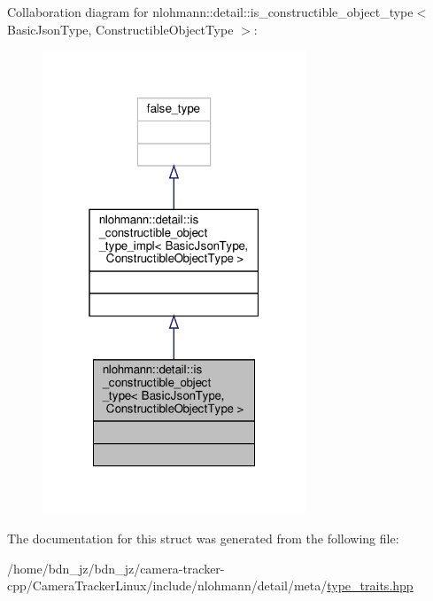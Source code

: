 Collaboration diagram for nlohmann\+:\+:detail\+:\+:is\+\_\+constructible\+\_\+object\+\_\+type$<$ Basic\+Json\+Type, Constructible\+Object\+Type $>$\+:
\nopagebreak
\begin{figure}[H]
\begin{center}
\leavevmode
\includegraphics[width=223pt]{structnlohmann_1_1detail_1_1is__constructible__object__type__coll__graph}
\end{center}
\end{figure}


The documentation for this struct was generated from the following file\+:\begin{DoxyCompactItemize}
\item 
/home/bdn\+\_\+jz/bdn\+\_\+jz/camera-\/tracker-\/cpp/\+Camera\+Tracker\+Linux/include/nlohmann/detail/meta/\hyperlink{type__traits_8hpp}{type\+\_\+traits.\+hpp}\end{DoxyCompactItemize}
